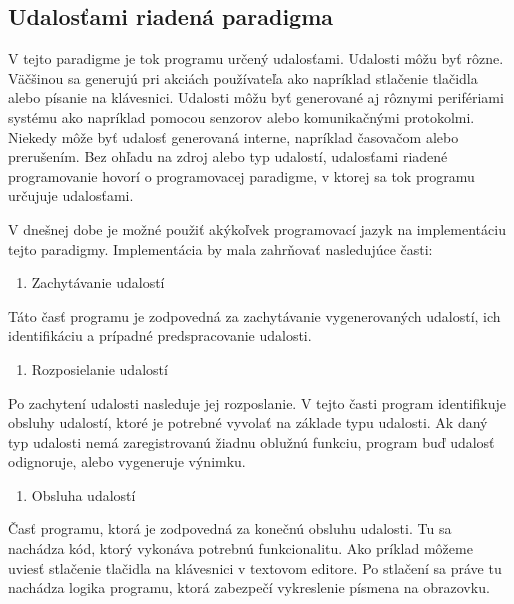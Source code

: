 \subsection{Udalosťami riadená paradigma}
\noindent V tejto paradigme je tok programu určený udalosťami. Udalosti môžu byť
rôzne. Väčšinou sa generujú pri akciách používateľa ako napríklad stlačenie tlačidla
alebo písanie na klávesnici. Udalosti môžu byť generované aj rôznymi perifériami systému ako napríklad pomocou senzorov alebo komunikačnými protokolmi. Niekedy môže byť udalosť generovaná interne, napríklad časovačom alebo prerušením. Bez ohľadu na
zdroj alebo typ udalostí, udalosťami riadené programovanie 
hovorí o programovacej paradigme, v ktorej sa tok
programu určujuje udalosťami.
\par V dnešnej dobe je možné použiť akýkoľvek programovací jazyk na implementáciu tejto paradigmy. Implementácia by mala zahrňovať nasledujúce časti:
\begin{enumerate}
  \item Zachytávanie udalostí
\end{enumerate}

\noindent \par 
Táto časť programu je zodpovedná za zachytávanie vygenerovaných udalostí, ich identifikáciu a prípadné predspracovanie udalosti.

\begin{enumerate}[resume]
  \item Rozposielanie udalostí
\end{enumerate}

\noindent \par
Po zachytení udalosti nasleduje jej rozposlanie. V tejto časti program identifikuje obsluhy udalostí, ktoré je potrebné vyvolať na základe typu udalosti. Ak daný typ udalosti nemá zaregistrovanú žiadnu oblužnú funkciu, program buď udalosť odignoruje, alebo vygeneruje výnimku.

\begin{enumerate}[resume]
  \item Obsluha udalostí
\end{enumerate}
 
\noindent \par
Časť programu, ktorá je zodpovedná za konečnú obsluhu udalosti. Tu sa nachádza kód, ktorý vykonáva potrebnú funkcionalitu. Ako príklad môžeme uviesť stlačenie tlačidla na klávesnici v textovom editore. Po stlačení sa práve tu nachádza logika programu, ktorá zabezpečí vykreslenie písmena na obrazovku.

